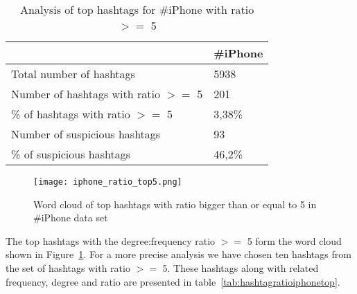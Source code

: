 \documentclass[journal, a4paper, 12pt]{article}
\begin{document}
     \begin{table}[!hbt]
		\begin{center}
		\caption{Analysis of top hashtags for \#iPhone with ratio $>=$ 5}
		\label{tab:hashtagratioiphone}
		\begin{tabular}{|p{5cm}|p{3cm}|}
			\hline
			 & \#iPhone \\
            \hline
			Total number of hashtags & 5938 \\
			\hline
			Number of hashtags with ratio $>=$ 5 & 201 \\
			\hline
			\% of hashtags with ratio $>=$ 5 & 3,38\% \\
            \hline
            Number of suspicious hashtags & 93 \\
			\hline
            \% of suspicious hashtags & 46,2\% \\
			\hline
		\end{tabular}
		\end{center}
	\end{table}
    
    
     \begin{figure}[!hbt]
		\begin{center}
		\texttt{[image: iphone\_ratio\_top5.png]}
		\caption{Word cloud of top hashtags with ratio bigger than or equal to 5 in \#iPhone data set}
		\label{fig:word_iphone}
		\end{center}
	\end{figure}
    
    
The top hashtags with the degree:frequency ratio $>=$ 5 form the word cloud shown in Figure~\ref{fig:word_iphone}. For a more precise analysis we have chosen ten hashtags from the set of hashtags with ratio $>=$ 5. These hashtags along with related frequency, degree and ratio are presented in table~\ref{tab:hashtagratioiphonetop}.
\\
\end{document}
